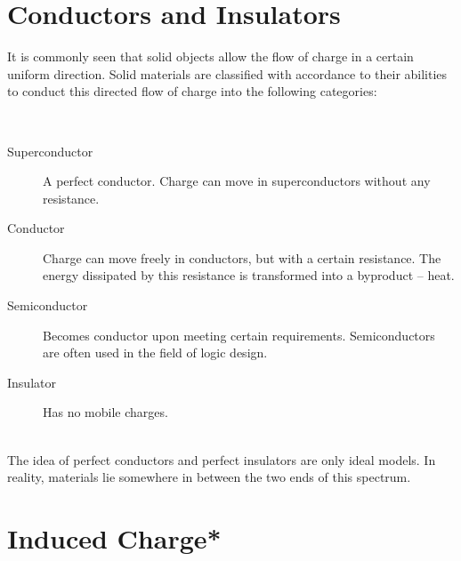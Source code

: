 \section{Conductors and Insulators}
It is commonly seen that solid objects allow the flow of charge in a certain uniform direction. Solid materials are classified with accordance to their abilities to conduct this directed flow of charge into the following categories:
\begin{definition}
    \ \begin{description}
        \item[Superconductor] A perfect conductor. Charge can move in superconductors without any resistance.
        \item[Conductor] Charge can move freely in conductors, but with a certain resistance. The energy dissipated by this resistance is transformed into a byproduct -- heat.
        \item[Semiconductor] Becomes conductor upon meeting certain requirements. Semiconductors are often used in the field of logic design.
        \item[Insulator] Has no mobile charges.
    \end{description}
\end{definition}
\vspace{-12pt}
\begin{remark}
    \ \\The idea of perfect conductors and perfect insulators are only ideal models. In reality, materials lie somewhere in between the two ends of this spectrum.
\end{remark}
\section{Induced Charge*}

